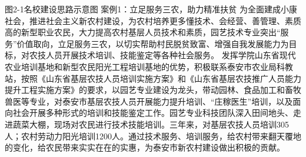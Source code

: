 图2-1名校建设思路示意图
案例1：立足服务三农，助力精准扶贫
为全面建成小康社会，推进社会主义新农村建设，为农村培养更多懂技术、会经营、善管理、素质高的新型职业农民，大力提高农村基层人员技术和素质，园艺技术专业突出“服务”价值取向，立足服务三农，以切实帮助村民脱贫致富、增强自我发展能力为目标，对农技人员开展技术培训、技能鉴定等各种社会服务。
发挥学院山东省现代农业培训基地和新型农民阳光工程培训基地的优势，积极联系泰安市农业局科教站，按照《山东省基层农技人员培训实施方案》和《山东省基层农技推广人员能力提升工程实施方案》的要求，以园艺专业建设为龙头，带动园林、食品加工和畜牧兽医等专业，对泰安市基层农技人员开展能力提升培训、“庄稼医生”培训，以及面向社会开展多种形式的培训和技能鉴定工作。园艺专业科技团队深入田间地头、走进蔬菜大棚，现场对农民进行技术技能培训。三年来，对基层农技人员培训305人；农村劳动力阳光培训1200人。通过技术服务、培训服务，给农村带来翻天覆地的变化，给农民带来实实在在的实惠，为泰安市新农村建设做出积极的贡献。

